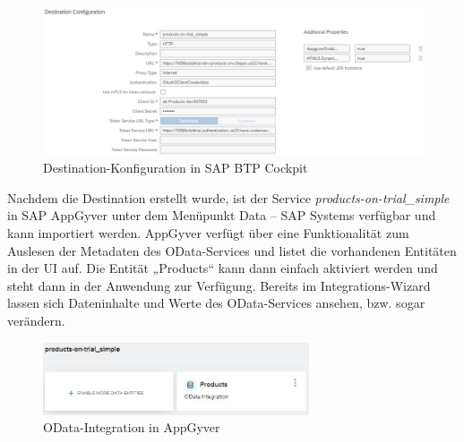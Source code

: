 \begin{figure}[htbp]
 \centering
 \includegraphics[width=1.0\textwidth]{Bilder/appgyver/3_10_destination.jpg}
 \caption{Destination-Konfiguration in SAP BTP Cockpit}
\end{figure}

Nachdem die Destination erstellt wurde, ist der Service \textit{products-on-trial\_simple} in SAP AppGyver unter dem Menüpunkt Data – SAP Systems verfügbar und kann importiert werden. AppGyver verfügt über eine Funktionalität zum Auslesen der Metadaten des OData-Services und listet die vorhandenen Entitäten in der UI auf. Die Entität „Products“ kann dann einfach aktiviert werden und steht dann in der Anwendung zur Verfügung. Bereits im Integrations-Wizard lassen sich Dateninhalte und Werte des OData-Services ansehen, bzw. sogar verändern.

\begin{figure}[htbp]
 \centering
 \includegraphics[width=0.7\textwidth]{Bilder/appgyver/3_11_odata integration_in_AppGyver.jpg}
 \caption{OData-Integration in AppGyver}
\end{figure}


